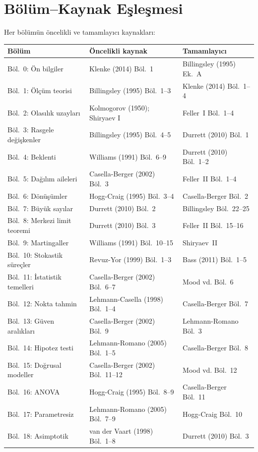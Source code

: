 \section{Bölüm–Kaynak Eşleşmesi}

Her bölümün öncelikli ve tamamlayıcı kaynakları:

\begin{center}
\renewcommand{\arraystretch}{1.5}
\small
\begin{tabular}{p{3.5cm}p{4.5cm}p{4.5cm}}
\hline
\textbf{Bölüm} & \textbf{Öncelikli kaynak} & \textbf{Tamamlayıcı} \\
\hline
Böl.~0: Ön bilgiler & Klenke (2014) Böl.~1 & Billingsley (1995) Ek.~A \\
Böl.~1: Ölçüm teorisi & Billingsley (1995) Böl.~1–3 & Klenke (2014) Böl.~1–4 \\
Böl.~2: Olasılık uzayları & Kolmogorov (1950); Shiryaev I & Feller~I Böl.~1–4 \\
Böl.~3: Rasgele değişkenler & Billingsley (1995) Böl.~4–5 & Durrett (2010) Böl.~1 \\
Böl.~4: Beklenti & Williams (1991) Böl.~6–9 & Durrett (2010) Böl.~1–2 \\
Böl.~5: Dağılım aileleri & Casella-Berger (2002) Böl.~3 & Feller~II Böl.~1–4 \\
Böl.~6: Dönüşümler & Hogg-Craig (1995) Böl.~3–4 & Casella-Berger Böl.~2 \\
Böl.~7: Büyük sayılar & Durrett (2010) Böl.~2 & Billingsley Böl.~22–25 \\
Böl.~8: Merkezi limit teoremi & Durrett (2010) Böl.~3 & Feller~II Böl.~15–16 \\
Böl.~9: Martingaller & Williams (1991) Böl.~10–15 & Shiryaev~II \\
Böl.~10: Stokastik süreçler & Revuz-Yor (1999) Böl.~1–3 & Bass (2011) Böl.~1–5 \\
Böl.~11: İstatistik temelleri & Casella-Berger (2002) Böl.~6–7 & Mood vd. Böl.~6 \\
Böl.~12: Nokta tahmin & Lehmann-Casella (1998) Böl.~1–4 & Casella-Berger Böl.~7 \\
Böl.~13: Güven aralıkları & Casella-Berger (2002) Böl.~9 & Lehmann-Romano Böl.~3 \\
Böl.~14: Hipotez testi & Lehmann-Romano (2005) Böl.~1–5 & Casella-Berger Böl.~8 \\
Böl.~15: Doğrusal modeller & Casella-Berger (2002) Böl.~11–12 & Mood vd. Böl.~12 \\
Böl.~16: ANOVA & Hogg-Craig (1995) Böl.~8–9 & Casella-Berger Böl.~11 \\
Böl.~17: Parametresiz & Lehmann-Romano (2005) Böl.~7–9 & Hogg-Craig Böl.~10 \\
Böl.~18: Asimptotik & van der Vaart (1998) Böl.~1–8 & Durrett (2010) Böl.~3 \\
\hline
\end{tabular}
\end{center}

